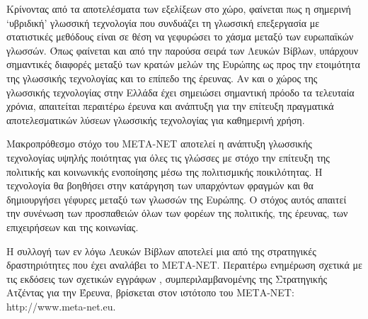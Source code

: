 \documentclass[]{../../metanetpaper}
\begin{document}
\begin{multicols}{2}

Κρίνοντας από τα αποτελέσματα των εξελίξεων στο χώρο, φαίνεται πως η σημερινή ‘υβριδική’ γλωσσική τεχνολογία που συνδυάζει τη γλωσσική επεξεργασία με στατιστικές μεθόδους είναι σε θέση να γεφυρώσει το χάσμα μεταξύ των ευρωπαϊκών γλωσσών. Όπως φαίνεται και από την παρούσα σειρά των Λευκών Βίβλων, υπάρχουν σημαντικές διαφορές μεταξύ των κρατών μελών της Ευρώπης ως προς την ετοιμότητα της γλωσσικής τεχνολογίας και το επίπεδο της έρευνας. Αν και ο χώρος της γλωσσικής τεχνολογίας στην Ελλάδα έχει σημειώσει σημαντική πρόοδο τα τελευταία χρόνια, απαιτείται περαιτέρω έρευνα και ανάπτυξη για την επίτευξη πραγματικά αποτελεσματικών λύσεων γλωσσικής τεχνολογίας για καθημερινή χρήση. 

Μακροπρόθεσμο στόχο του ΜΕΤΑ-ΝΕΤ αποτελεί η ανάπτυξη γλωσσικής τεχνολογίας υψηλής ποιότητας για όλες τις γλώσσες με στόχο την επίτευξη της πολιτικής και κοινωνικής ενοποίησης μέσω της πολιτισμικής ποικιλότητας. Η τεχνολογία θα βοηθήσει στην κατάργηση των υπαρχόντων φραγμών και θα δημιουργήσει γέφυρες μεταξύ των γλωσσών της Ευρώπης. Ο στόχος αυτός απαιτεί  την συνένωση των προσπαθειών όλων των φορέων της πολιτικής, της έρευνας, των επιχειρήσεων και της κοινωνίας.

Η συλλογή των εν λόγω Λευκών Βίβλων αποτελεί μια από της στρατηγικές δραστηριότητες που έχει αναλάβει το ΜΕΤΑ-ΝΕΤ. Περαιτέρω ενημέρωση σχετικά με τις εκδόσεις των σχετικών εγγράφων \cite{Meta1},  συμπεριλαμβανομένης της Στρατηγικής Ατζέντας για την Έρευνα, βρίσκεται στον ιστότοπο του ΜΕΤΑ-ΝΕΤ: http://www.meta-net.eu.
\end{multicols}

\clearpage


\end{document}
